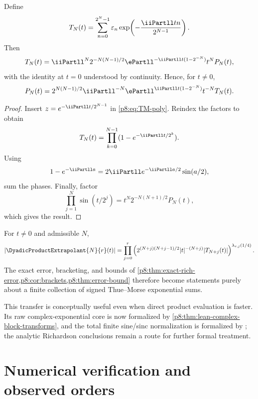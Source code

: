 \documentclass[11pt]{article}
\numberwithin{equation}{section}
\theoremstyle{definition}
\theoremstyle{remark}
\begin{document}
\begin{proposition}
\label{p8:prop:TM-PN}
Define
\begin{equation}
T_N(t)=\sum_{n=0}^{2^N-1}\varepsilon_n
\exp\!\left(-\frac{\iiPartll tn}{2^{N-1}}\right).
\label{p8:eq:TN}
\end{equation}
Then
\begin{equation}
T_N(t)=\iiPartll^N2^{-N(N-1)/2}
\ePartll^{-\iiPartll t(1-2^{-N})}t^N P_N(t),
\label{p8:eq:TN-PN}
\end{equation}
with the identity at $t=0$ understood by continuity. Hence, for $t\ne0$,
\begin{equation}
P_N(t)=2^{N(N-1)/2}\iiPartll^{-N}
\ePartll^{\iiPartll t(1-2^{-N})}t^{-N}T_N(t).
\label{p8:eq:PN-TN}
\end{equation}
\end{proposition}

\begin{proof}
Insert $z=e^{-\iiPartll t/2^{N-1}}$ in \cref{p8:eq:TM-poly}. Reindex the factors to obtain
\[
T_N(t)=\prod_{k=0}^{N-1}(1-e^{-\iiPartll t/2^k}).
\]
Using
\[
1-e^{-\iiPartll a}=2\iiPartll e^{-\iiPartll a/2}\sin(a/2),
\]
sum the phases.  Finally, factor
\[
\prod_{j=1}^{N}\sin(t/2^j)
=t^N2^{-N(N+1)/2}P_N(t),
\]
which gives the result.
\end{proof}

\begin{corollary}
\label{p8:cor:TM-accelerated}
For $t\ne0$ and admissible $N$,
\begin{equation}
|\DyadicProductExtrapolant{N}{r}(t)|
=\prod_{j=0}^{r}
\left(
2^{(N+j)(N+j-1)/2}|t|^{-(N+j)}|T_{N+j}(t)|
\right)^{\lambda_{r,j}(1/4)}.
\label{p8:eq:TM-accelerated}
\end{equation}
The exact error, bracketing, and bounds of \cref{p8:thm:exact-rich-error,p8:cor:brackets,p8:thm:error-bound} therefore become statements purely about a finite collection of signed Thue--Morse exponential sums.
\end{corollary}

This transfer is conceptually useful even when direct product evaluation is faster.  Its raw
complex-exponential core is now formalized by
\cref{p8:thm:lean-complex-block-transforms}, and the total finite sine/sinc normalization is
formalized by ; the analytic Richardson conclusions
remain a route for further formal treatment.

\section{Numerical verification and observed orders}
\label{p8:sec:numerics}
\end{document}

